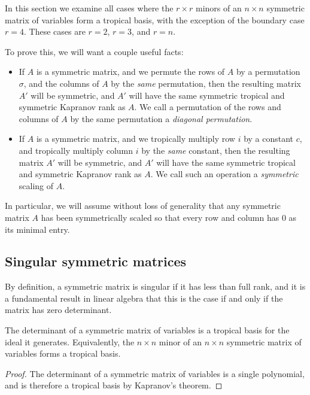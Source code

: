 \documentclass{article}
\begin{document}
In this section we examine all cases where the $r \times r$ minors of an $n \times n$ symmetric matrix of variables form a tropical basis, with the exception of the boundary case $r = 4$. These cases are $r = 2$, $r = 3$, and $r = n$.

To prove this, we will want a couple useful facts:

\begin{itemize}
  
\item If $A$ is a symmetric matrix, and we permute the rows of $A$ by a permutation $\sigma$, and the columns of $A$ by the \emph{same} permutation, then the resulting matrix $A'$ will be symmetric, and $A'$ will have the same symmetric tropical and symmetric Kapranov rank as $A$. We call a permutation of the rows and columns of $A$ by the same permutation a \emph{diagonal permutation}. 
  
\item If $A$ is a symmetric matrix, and we tropically multiply row $i$ by a constant $c$, and tropically multiply column $i$ by the \emph{same} constant, then the resulting matrix $A'$ will be symmetric, and $A'$ will have the same symmetric tropical and symmetric Kapranov rank as $A$. We call such an operation a \emph{symmetric} scaling of $A$.
  
\end{itemize}

In particular, we will assume without loss of generality that any symmetric matrix $A$ has been symmetrically scaled so that every row and column has $0$ as its minimal entry.

\subsection{Singular symmetric matrices}

By definition, a symmetric matrix is singular if it has less than full rank, and it is a fundamental result in linear algebra that this is the case if and only if the matrix has zero determinant.

\begin{thm}
  The determinant of a symmetric matrix of variables is a tropical basis for the ideal it generates. Equivalently, the $n \times n$ minor of an $n \times n$ symmetric matrix of variables forms a tropical basis.
\end{thm}

\begin{proof}
  The determinant of a symmetric matrix of variables is a single polynomial, and is therefore a tropical basis by Kapranov's theorem.
\end{proof}
\end{document}
